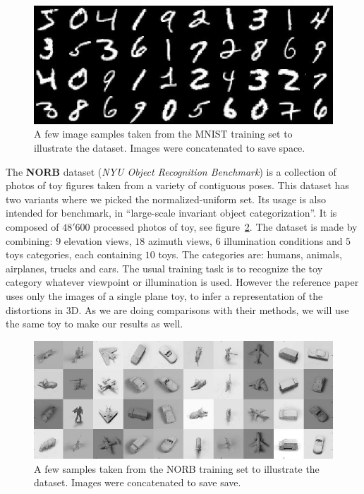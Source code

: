 \documentclass[a4paper,12pt]{report}
\begin{document}
\begin{figure}[t]
    \begin{center}
        \includegraphics{thesis_figures/mnist.jpg}
    \end{center}
    \caption{A few image samples taken from the MNIST training set to illustrate the dataset. Images were concatenated to save space.}
    \label{fig:mnist}
\end{figure}

The {\bf NORB} dataset ({\em NYU Object Recognition Benchmark}) is a collection of photos of toy figures taken from a variety of contiguous poses.
This dataset has two variants where we picked the normalized-uniform set.
Its usage is also intended for benchmark, in ``large-scale invariant object categorization''.
It is composed of $48'600$ processed photos of toy, see figure~\ref{fig:norb}.
The dataset is made by combining: $9$ elevation views, $18$ azimuth views, $6$ illumination conditions and $5$ toys categories, each containing $10$ toys.
The categories are: humans, animals, airplanes, trucks and cars.
The usual training task is to recognize the toy category whatever viewpoint or illumination is used.
However the reference paper uses only the images of a single plane toy, to infer a representation of the distortions in 3D.
As we are doing comparisons with their methods, we will use the same toy to make our results as well.

\begin{figure}[t]
    \begin{center}
        \includegraphics{thesis_figures/norb.jpg}
    \end{center}
    \caption{A few samples taken from the NORB training set to illustrate the dataset. Images were concatenated to save save.}
    \label{fig:norb}
\end{figure}
\end{document}
